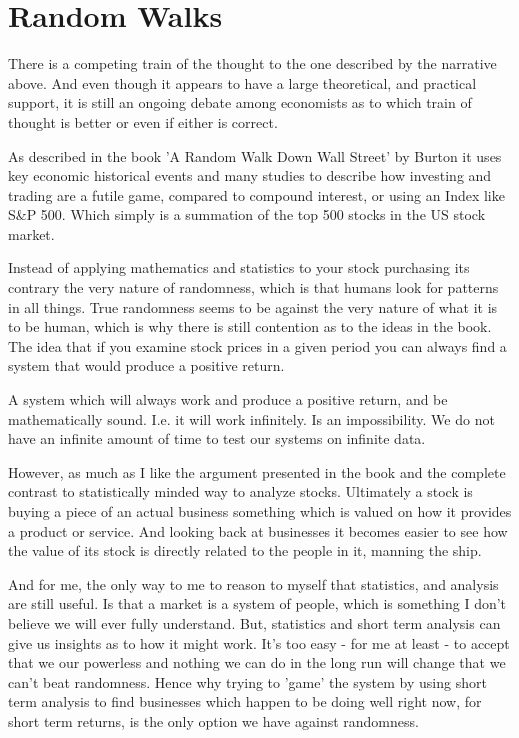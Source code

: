 \documentclass[12pt]{article}
\begin{document}
\section{Random Walks}

    There is a competing train of the thought to the one described by the narrative above. And 
    even though it appears to have a large theoretical, and practical support, it is still an 
    ongoing debate among economists as to which train of thought is better or even if either is 
    correct.

    As described in the book 'A Random Walk Down Wall Street' by Burton \cite{Burton} it uses
    key economic historical events and many studies to describe how investing and trading are
    a futile game, compared to compound interest, or using an Index like S\&P 500. Which
    simply is a summation of the top 500 stocks in the US stock market.

    Instead of applying mathematics and statistics to your stock purchasing its contrary the 
    very nature of randomness, which is that humans look for patterns in all things. True 
    randomness seems to be against the very nature of what it is to be human, which is why
    there is still contention as to the ideas in the book. The idea that if you examine stock
    prices in a given period you can always find a system that would produce a positive return.

    A system which will always work and produce a positive return, and be mathematically sound. 
    I.e. it will work infinitely. Is an impossibility. We do not have an infinite amount of
    time to test our systems on infinite data.

    However, as much as I like the argument presented in the book and the complete contrast to 
    statistically minded way to analyze stocks. Ultimately a stock is buying a piece of an 
    actual business something which is valued on how it provides a product or service. And 
    looking back at businesses it becomes easier to see how the value of its stock is directly 
    related to the people in it, manning the ship.

    And for me, the only way to me to reason to myself that statistics, and analysis are still 
    useful. Is that a market is a system of people, which is something I don't believe we will 
    ever fully understand. But, statistics and short term analysis can give us insights as to 
    how it might work. It's too easy - for me at least - to accept that we our powerless and 
    nothing we can do in the long run will change that we can't beat randomness. Hence why
    trying to 'game' the system by using short term analysis to find businesses which happen
    to be doing well right now, for short term returns, is the only option we have against
    randomness.

\pagebreak


\end{document}
